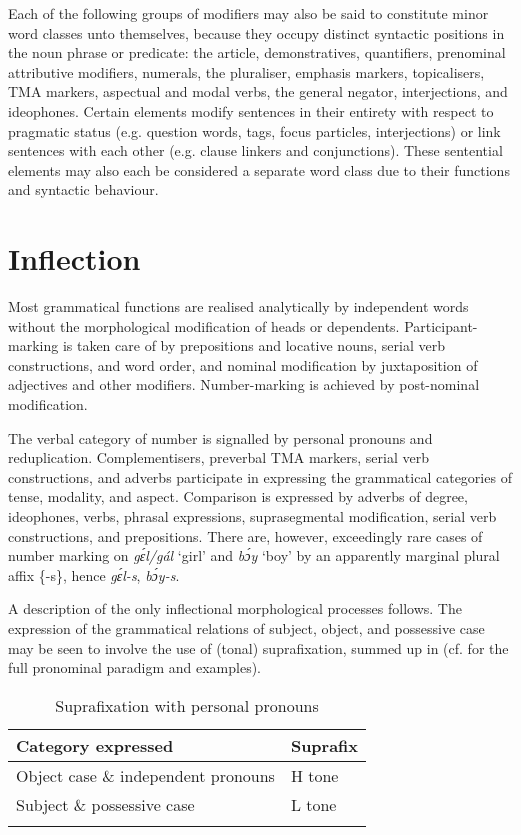 Each of the following groups of modifiers may also be said to constitute minor word classes unto themselves, because they occupy distinct syntactic positions in the noun phrase or predicate: the article, demonstratives, quantifiers, prenominal attributive modifiers, numerals, the pluraliser, emphasis markers, topicalisers, TMA markers, aspectual and modal verbs, the general negator, interjections, and ideophones. Certain elements modify sentences in their entirety with respect to pragmatic status (e.g. question words, tags, focus particles, interjections) or link sentences with each other (e.g. clause linkers and conjunctions). These sentential elements may also each be considered a separate word class due to their functions and syntactic behaviour. 


\section{Inflection}\label{sec:4.2}

Most grammatical functions are realised analytically by independent words without the morphological modification of heads or dependents. Participant-marking is taken care of by prepositions and locative nouns, serial verb constructions, and word order, and nominal modification by juxtaposition of adjectives and other modifiers. Number-marking is achieved by post-nominal modification. 

The verbal category of number is signalled by personal pronouns and reduplication. Complementisers, preverbal TMA markers, serial verb constructions, and adverbs participate in expressing the grammatical categories of tense{\fff}, modality, and aspect. Comparison is expressed by adverbs of degree, ideophones, verbs, phrasal expressions, suprasegmental modification, serial verb constructions, and prepositions. There are, however, exceedingly rare cases of number marking on \textit{gɛ́l/gál} ‘girl’ and \textit{bɔ́y} ‘boy’ by an apparently marginal plural affix \{-s\}, hence \textit{gɛ́l-s}, \textit{bɔ́y-s}. 


A description of the only inflectional morphological processes follows. The expression of the grammatical relations of subject, object, and possessive case may be seen to involve the use of (tonal) suprafixation, summed up in  (cf.  for the full pronominal paradigm and examples).


\begin{table}
\caption{Suprafixation with personal pronouns}
\label{tab:key:4.1}

\begin{tabularx}{.75\textwidth}{Xl}
\lsptoprule

Category expressed & Suprafix\\
\midrule
Object case \& independent pronouns & H tone\\
Subject \& possessive case & L tone\\
\lspbottomrule
\end{tabularx}
\end{table}

